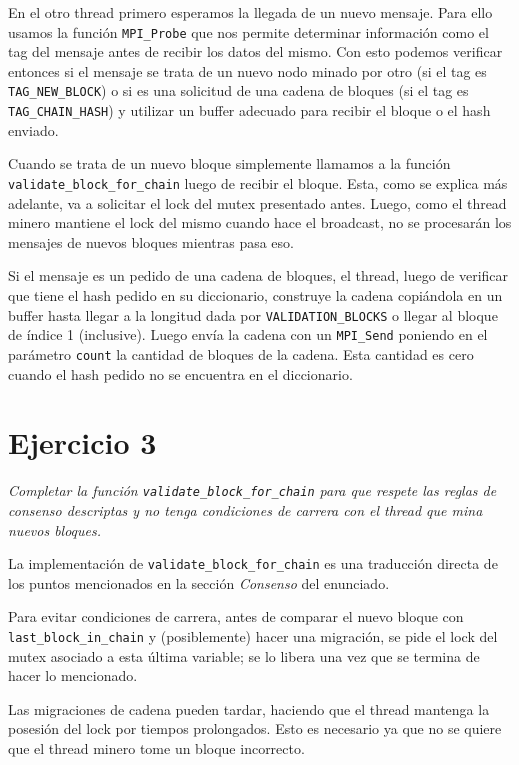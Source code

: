 En el otro thread primero esperamos la llegada de un nuevo mensaje. Para ello usamos la función \texttt{MPI\_Probe} que nos permite determinar información como el tag del mensaje antes de recibir los datos del mismo. Con esto podemos verificar entonces si el mensaje se trata de un nuevo nodo minado por otro (si el tag es \texttt{TAG\_NEW\_BLOCK}) o si es una solicitud de una cadena de bloques (si el tag es \texttt{TAG\_CHAIN\_HASH}) y utilizar un buffer adecuado para recibir el bloque o el hash enviado.

Cuando se trata de un nuevo bloque simplemente llamamos a la función \texttt{validate\_block\_for\_chain} luego de recibir el bloque. Esta, como se explica más adelante, va a solicitar el lock del mutex presentado antes. Luego, como el thread minero mantiene el lock del mismo cuando hace el broadcast, no se procesarán los mensajes de nuevos bloques mientras pasa eso.

Si el mensaje es un pedido de una cadena de bloques, el thread, luego de verificar que tiene el hash pedido en su diccionario, construye la cadena copiándola en un buffer hasta llegar a la longitud dada por \texttt{VALIDATION\_BLOCKS} o llegar al bloque de índice 1 (inclusive). Luego envía la cadena con un \texttt{MPI\_Send} poniendo en el parámetro \texttt{count} la cantidad de bloques de la cadena. Esta cantidad es cero cuando el hash pedido no se encuentra en el diccionario.


\section{Ejercicio 3}

\emph{Completar la función \texttt{validate\_block\_for\_chain} para que respete las reglas de consenso descriptas y no tenga condiciones de carrera con el thread que mina nuevos bloques.}

La implementación de \texttt{validate\_block\_for\_chain} es una traducción directa de los puntos mencionados en la sección \emph{Consenso} del enunciado.

Para evitar condiciones de carrera, antes de comparar el nuevo bloque con \texttt{last\_block\_in\_chain} y (posiblemente) hacer una migración, se pide el lock del mutex asociado a esta última variable; se lo libera una vez que se termina de hacer lo mencionado.

Las migraciones de cadena pueden tardar, haciendo que el thread mantenga la posesión del lock por tiempos prolongados. Esto es necesario ya que no se quiere que el thread minero tome un bloque incorrecto.


